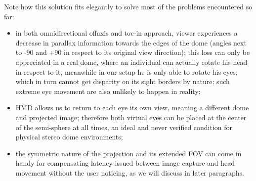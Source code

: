 Note how this solution fits elegantly to solve most of the problems encountered so far:
\begin{itemize}
\item in both omnidirectional offaxis and toe-in approach, viewer experiences a decrease in parallax information towards the edges of the dome (angles next to -90 and +90 in respect to its original view direction); this loss can only be appreciated in a real dome, where an individual can actually rotate his head in respect to it, meanwhile in our setup he is only able to rotate his eyes, which in turn cannot get disparity on its sight borders by nature; such extreme eye movement are also unlikely to happen in reality;
\item HMD allows us to return to each eye its own view, meaning a different dome and projected image; therefore both virtual eyes can be placed at the center of the semi-sphere at all times, an ideal and never verified condition for physical stereo dome environments;
\item the symmetric nature of the projection and its extended FOV can come in handy for compensating latency issued between image capture and head movement without the user noticing, as we will discuss in later paragraphs.
\end{itemize}

